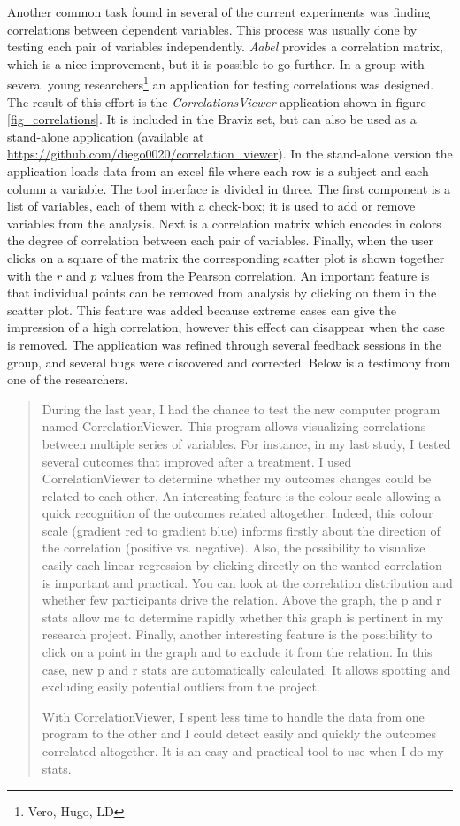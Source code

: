 Another common task found in several of the current experiments was finding correlations between dependent variables. This process was usually done by testing each pair of variables independently. \emph{Aabel} provides a correlation matrix, which is a nice improvement, but it is possible to go further. In a group with several young researchers\footnote{Vero, Hugo, LD} an application for testing correlations was designed. The result of this effort is the \emph{CorrelationsViewer} application shown in figure \ref{fig_correlations}. It is included in the Braviz set, but can also be used as a stand-alone application (available at \url{https://github.com/diego0020/correlation_viewer}). In the stand-alone version the application loads data from an excel file where each row is a subject and each column a variable. The tool interface is divided in three. The first component is a list of variables, each of them with a check-box; it is used to add or remove variables from the analysis. Next is a correlation matrix which encodes in colors the degree of correlation between each pair of variables. Finally, when the user clicks on a square of the matrix the corresponding scatter plot is shown together with the $r$ and $p$ values from the Pearson correlation. An important feature is that individual points can be removed from analysis by clicking on them in the scatter plot. This feature was added because extreme cases can give the impression of a high correlation, however this effect can disappear when the case is removed. The application was refined through several feedback sessions in the group, and several bugs were discovered and corrected.  Below is a testimony from one of the researchers.

\begin{quote}
During the last year, I had the chance to test the new computer program named CorrelationViewer. This program allows visualizing correlations between multiple series of variables. For instance, in my last study, I tested several outcomes that improved after a treatment. I used CorrelationViewer to determine whether my outcomes changes could be related to each other. An interesting feature is the colour scale allowing a quick recognition of the outcomes related altogether. Indeed, this colour scale (gradient red to gradient blue) informs firstly about the direction of the correlation (positive vs. negative). Also, the possibility to visualize easily each linear regression by clicking directly on the wanted correlation is important and practical. You can look at the correlation distribution and whether few participants drive the relation. Above the graph, the p and r stats allow me to determine rapidly whether this graph is pertinent in my research project. Finally, another interesting feature is the possibility to click on a point in the graph and to exclude it from the relation. In this case, new p and r stats are automatically calculated. It allows spotting and excluding easily potential outliers from the project.

With CorrelationViewer, I spent less time to handle the data from one program to the other and I could detect easily and quickly the outcomes correlated altogether. It is an easy and practical tool to use when I do my stats. 
\end{quote}

